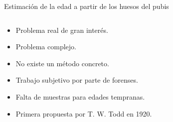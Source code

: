 \documentclass{beamer}
\begin{document}
\begin{frame}{Estimación de la edad a partir de los huesos del pubis}

	\begin{columns}[T]
		\begin{column}{.4\textwidth}
			\begin{itemize}
				\item Problema real de gran interés.
				\item Problema complejo.
				\item No existe un método concreto.
				\item Trabajo subjetivo por parte de forenses.
				\item Falta de muestras para edades tempranas.
				\item Primera propuesta por T. W. Todd en 1920.
			\end{itemize}

		\end{column}


\end{columns}
\end{frame}
\end{document}
